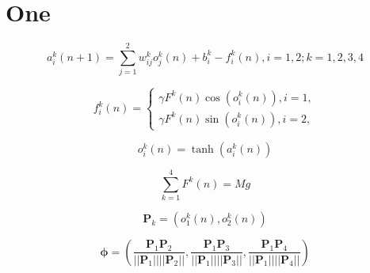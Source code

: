 \documentclass{article}
\renewcommand{\vec}[1]{\mathbf{#1}}
\begin{document}
\section{One}

\begin{equation}
    a_{i}^k(n+1)=\sum_{j=1}^{2} w_{ij}^{k}o_{j}^{k}(n)+b_{i}^{k}-f_{i}^{k}(n), i=1,2; k=1,2,3,4
    \label{equ:1}
\end{equation}



\begin{equation}
    f_{i}^{k}(n)=\left\{
        \begin{array}{rcl}
            \gamma F^{k}(n) \cos(o_{i}^{k}(n)), i=1,\\
            \gamma F^{k}(n) \sin(o_{i}^{k}(n)), i=2,
        \end{array}
    \right.
    \label{equ:2}
\end{equation}



\begin{equation}
    o_{i}^{k}(n) = \tanh(a_{i}^{k}(n))
    \label{equ:3}
\end{equation}

\begin{equation}
    \sum_{k=1}^{4} F^{k}(n)=Mg
    \label{equ:4}
\end{equation}



\begin{equation}
    \vec{P}_{k}=(o_{1}^{k}(n),o_{2}^{k}(n))
    \label{<+label+>}
\end{equation}





\begin{equation}
    \vec{\vec{\phi}}= (\frac{\vec{P}_{1} \vec{P}_{2}}{||\vec{P}_{1}|| ||\vec{P}_{2}||}, \frac{\vec{P}_{1} \vec{P}_{3}}{||\vec{P}_{1}|| ||\vec{P}_{3}||}, \frac{\vec{P}_{1} \vec{P}_{4}}{||\vec{P}_{1}|| ||\vec{P}_{4}||})
    \label{<+label+>}
\end{equation}

\end{document}
